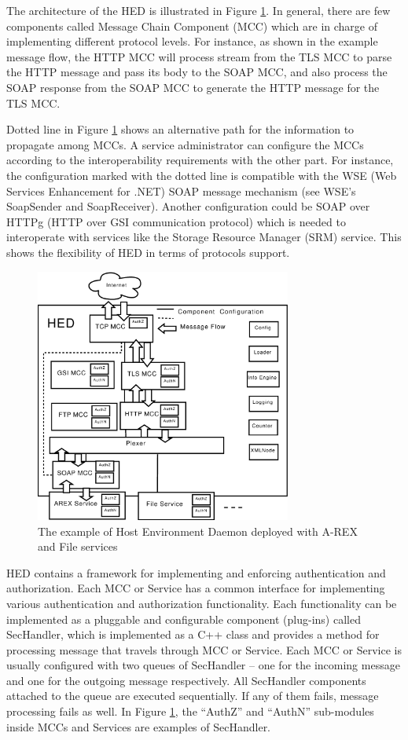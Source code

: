 The architecture of the HED is illustrated in Figure \ref{fig:HED}. In general, there are few components called Message Chain Component (MCC) which are in charge of implementing different protocol levels. For instance, as shown in the example message flow, the HTTP MCC will process stream from the TLS MCC to parse the HTTP message and pass its body to the SOAP MCC, and also process the SOAP response from the SOAP MCC to generate the HTTP message for the TLS MCC.

Dotted line in Figure \ref{fig:HED} shows an alternative path for the information to propagate among MCCs. A service administrator can configure the MCCs according to the interoperability requirements with the other part. For instance, the configuration marked with the dotted line is compatible with the WSE (Web Services Enhancement for .NET) SOAP message mechanism (see WSE’s SoapSender and SoapReceiver)\cite{WSElink}. Another configuration could be SOAP over HTTPg (HTTP over GSI communication protocol) which is needed to interoperate with services like the Storage Resource Manager (SRM)\cite{AShoshani03} service. This shows the flexibility of HED in terms of protocols support.

\begin{figure}
\includegraphics[width=0.75\textwidth]{HED.eps}
\caption{The example of Host Environment Daemon deployed with A-REX and File services}
\label{fig:HED}
\end{figure}
HED contains a framework for implementing and enforcing authentication and authorization. Each MCC or Service has a common interface for implementing various authentication and authorization functionality. Each functionality can be implemented as a pluggable and configurable component (plug-ins) called SecHandler, which is implemented as a C++ class and provides a method for processing message that travels through MCC or Service. Each MCC or Service is usually configured with two queues of SecHandler – one for the incoming message and one for the outgoing message respectively. All SecHandler components attached to the queue are executed sequentially. If any of them fails, message processing fails as well. In Figure \ref{fig:HED}, the “AuthZ” and “AuthN” sub-modules inside MCCs and Services are examples of SecHandler.

